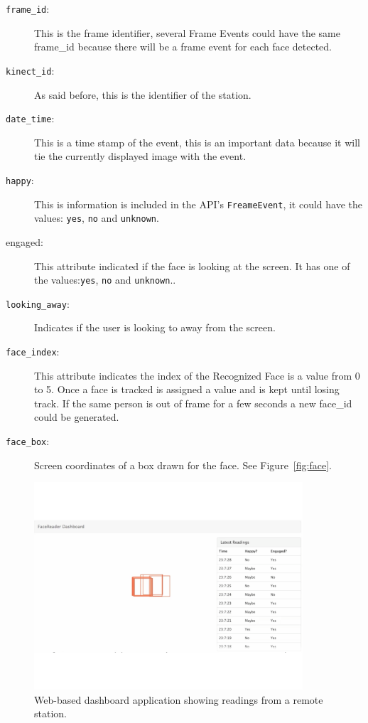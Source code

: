 \documentclass[graybox]{svmult}
\begin{document}
\begin{description}
    \item[\texttt{frame\_id}:] This is the frame identifier, several Frame Events could have the same frame\_id because there will be a frame event for each face detected.
    \item[\texttt{kinect\_id}:] As said before, this is the identifier of the station.
    \item[\texttt{date\_time}:] This is a time stamp of the event, this is an important data because it will tie the currently displayed image with the event.
    \item[\texttt{happy}:] This is information is included in the API's \texttt{FreameEvent}, it could have the values: \texttt{yes}, \texttt{no} and \texttt{unknown}.
    \item[engaged:] This attribute indicated if the face is looking at the screen. It has one of the values:\texttt{yes}, \texttt{no} and \texttt{unknown}..

    \item[\texttt{looking\_away}:] Indicates if the user is looking to away from the screen.
    \item[\texttt{face\_index}:] This attribute indicates the index of the Recognized Face is a value from 0 to 5. Once a face is tracked is assigned a value and is kept until losing track. If the same person is out of frame for a few seconds a new face\_id could be generated.
    \item[\texttt{face\_box}:] Screen coordinates of a box drawn for the face. See Figure~\ref{fig:face}.
\end{description}

\begin{figure}[b]
\centering 
\includegraphics[width=10cm]{img/dash.pdf}

\caption{ Web-based dashboard application showing readings from a remote station.}
\label{fig:dashboard}       %
\end{figure}
\end{document}
